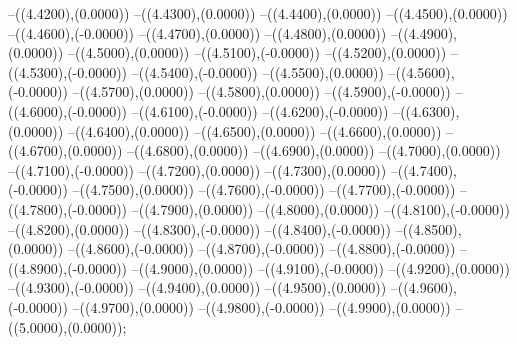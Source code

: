 {	--({\sx*(4.4200)},{\sy*(0.0000)})
	--({\sx*(4.4300)},{\sy*(0.0000)})
	--({\sx*(4.4400)},{\sy*(0.0000)})
	--({\sx*(4.4500)},{\sy*(0.0000)})
	--({\sx*(4.4600)},{\sy*(-0.0000)})
	--({\sx*(4.4700)},{\sy*(0.0000)})
	--({\sx*(4.4800)},{\sy*(0.0000)})
	--({\sx*(4.4900)},{\sy*(0.0000)})
	--({\sx*(4.5000)},{\sy*(0.0000)})
	--({\sx*(4.5100)},{\sy*(-0.0000)})
	--({\sx*(4.5200)},{\sy*(0.0000)})
	--({\sx*(4.5300)},{\sy*(-0.0000)})
	--({\sx*(4.5400)},{\sy*(-0.0000)})
	--({\sx*(4.5500)},{\sy*(0.0000)})
	--({\sx*(4.5600)},{\sy*(-0.0000)})
	--({\sx*(4.5700)},{\sy*(0.0000)})
	--({\sx*(4.5800)},{\sy*(0.0000)})
	--({\sx*(4.5900)},{\sy*(-0.0000)})
	--({\sx*(4.6000)},{\sy*(-0.0000)})
	--({\sx*(4.6100)},{\sy*(-0.0000)})
	--({\sx*(4.6200)},{\sy*(-0.0000)})
	--({\sx*(4.6300)},{\sy*(0.0000)})
	--({\sx*(4.6400)},{\sy*(0.0000)})
	--({\sx*(4.6500)},{\sy*(0.0000)})
	--({\sx*(4.6600)},{\sy*(0.0000)})
	--({\sx*(4.6700)},{\sy*(0.0000)})
	--({\sx*(4.6800)},{\sy*(0.0000)})
	--({\sx*(4.6900)},{\sy*(0.0000)})
	--({\sx*(4.7000)},{\sy*(0.0000)})
	--({\sx*(4.7100)},{\sy*(-0.0000)})
	--({\sx*(4.7200)},{\sy*(0.0000)})
	--({\sx*(4.7300)},{\sy*(0.0000)})
	--({\sx*(4.7400)},{\sy*(-0.0000)})
	--({\sx*(4.7500)},{\sy*(0.0000)})
	--({\sx*(4.7600)},{\sy*(-0.0000)})
	--({\sx*(4.7700)},{\sy*(-0.0000)})
	--({\sx*(4.7800)},{\sy*(-0.0000)})
	--({\sx*(4.7900)},{\sy*(0.0000)})
	--({\sx*(4.8000)},{\sy*(0.0000)})
	--({\sx*(4.8100)},{\sy*(-0.0000)})
	--({\sx*(4.8200)},{\sy*(0.0000)})
	--({\sx*(4.8300)},{\sy*(-0.0000)})
	--({\sx*(4.8400)},{\sy*(-0.0000)})
	--({\sx*(4.8500)},{\sy*(0.0000)})
	--({\sx*(4.8600)},{\sy*(-0.0000)})
	--({\sx*(4.8700)},{\sy*(-0.0000)})
	--({\sx*(4.8800)},{\sy*(-0.0000)})
	--({\sx*(4.8900)},{\sy*(-0.0000)})
	--({\sx*(4.9000)},{\sy*(0.0000)})
	--({\sx*(4.9100)},{\sy*(-0.0000)})
	--({\sx*(4.9200)},{\sy*(0.0000)})
	--({\sx*(4.9300)},{\sy*(-0.0000)})
	--({\sx*(4.9400)},{\sy*(0.0000)})
	--({\sx*(4.9500)},{\sy*(0.0000)})
	--({\sx*(4.9600)},{\sy*(-0.0000)})
	--({\sx*(4.9700)},{\sy*(0.0000)})
	--({\sx*(4.9800)},{\sy*(-0.0000)})
	--({\sx*(4.9900)},{\sy*(0.0000)})
	--({\sx*(5.0000)},{\sy*(0.0000)});
}
